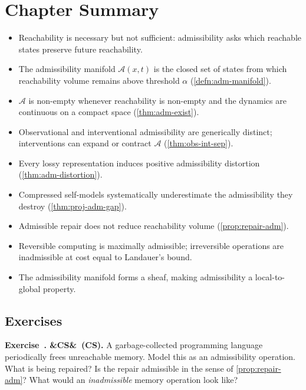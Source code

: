 \documentclass[12pt,twoside,openright]{book}
\newcommand{\adm}{\mathcal{A}}
\newenvironment{chapsummary}{%
  \begin{tcolorbox}[colback=DistBlue!5,colframe=DistBlue,
    title={\faBookOpen\enspace Summary},
    fonttitle=\sffamily\bfseries\color{white},
    attach boxed title to top left={yshift=-2mm,xshift=4mm},
    boxed title style={colback=DistBlue,rounded corners}]
  \begin{itemize}[nosep,leftmargin=*]}{%
  \end{itemize}\end{tcolorbox}}
\newcounter{exercise}[chapter]
\newenvironment{exercise}[1][]{%
  \refstepcounter{exercise}%
  \noindent\textbf{\sffamily\color{DistBlue}%
  Exercise~\thechapter.\theexercise%
  \ifx&#1&\else~(#1)\fi.}\enspace}{\par\medskip}
\begin{document}
\section*{Chapter Summary}
\begin{chapsummary}
  \item Reachability is necessary but not sufficient:
        admissibility asks which reachable states preserve
        future reachability.
  \item The admissibility manifold $\adm(x,t)$ is the
        closed set of states from which reachability volume
        remains above threshold $\alpha$
        (\cref{defn:adm-manifold}).
  \item $\adm$ is non-empty whenever reachability is
        non-empty and the dynamics are continuous on a
        compact space (\cref{thm:adm-exist}).
  \item Observational and interventional admissibility are
        generically distinct; interventions can expand or
        contract $\adm$ (\cref{thm:obs-int-sep}).
  \item Every lossy representation induces positive
        admissibility distortion (\cref{thm:adm-distortion}).
  \item Compressed self-models systematically underestimate
        the admissibility they destroy
        (\cref{thm:proj-adm-gap}).
  \item Admissible repair does not reduce reachability
        volume (\cref{prop:repair-adm}).
  \item Reversible computing is maximally admissible;
        irreversible operations are inadmissible at cost
        equal to Landauer's bound.
  \item The admissibility manifold forms a sheaf, making
        admissibility a local-to-global property.
\end{chapsummary}

\subsection*{Exercises}

\begin{exercise}[CS]
  A garbage-collected programming language periodically
  frees unreachable memory. Model this as an admissibility
  operation. What is being repaired? Is the repair
  admissible in the sense of \cref{prop:repair-adm}? What
  would an \emph{inadmissible} memory operation look like?
\end{exercise}
\end{document}
